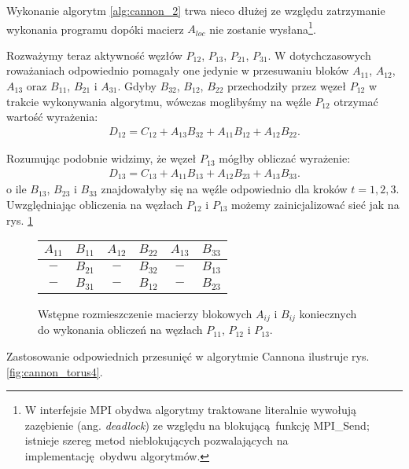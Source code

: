 Wykonanie algorytm \ref{alg:cannon_2} trwa nieco dłużej ze względu zatrzymanie wykonania programu dopóki macierz \(A_{loc}\) nie zostanie wysłana\footnote{W interfejsie MPI obydwa algorytmy traktowane literalnie wywołują zazębienie (ang. \emph{deadlock}) ze względu na blokującą funkcję MPI\_Send; istnieje szereg metod nieblokujących pozwalających na implementację obydwu algorytmów.}.

Rozważymy teraz aktywność węzłów \(P_{12}\), \(P_{13}\), \(P_{21}\), \(P_{31}\). W dotychczasowych roważaniach odpowiednio pomagały one jedynie w przesuwaniu bloków \(A_{11}\), \(A_{12}\), \(A_{13}\) oraz \(B_{11}\), \(B_{21}\) i \(A_{31}\). Gdyby \(B_{32}\), \(B_{12}\), \(B_{22}\) przechodziły przez węzeł \(P_{12}\) w trakcie wykonywania algorytmu, wówczas moglibyśmy na węźle \(P_{12}\) otrzymać wartość wyrażenia:
\begin{align*}
D_{12} = C_{12} + A_{13}B_{32} + A_{11}B_{12} + A_{12}B_{22}.
\end{align*}

\noindent Rozumując podobnie widzimy, że węzeł \(P_{13}\) mógłby obliczać wyrażenie:
\begin{align*}
D_{13} = C_{13} + A_{11}B_{13} + A_{12}B_{23} + A_{13}B_{33}.
\end{align*}
\noindent o ile \(B_{13}\), \(B_{23}\) i \(B_{33}\) znajdowałyby się na węźle odpowiednio dla kroków \(t=1, 2, 3\). Uwzględniając obliczenia na węzłach \(P_{12}\) i \(P_{13}\) możemy zainicjalizować sieć jak na rys. \ref{fig:cannon_torus_init}

\begin{figure}[h]
\centering
\begin{tabular}{|cc|cc|cc|}
\hline
\(A_{11}\) & \(B_{11}\) & \(A_{12}\) & \(B_{22}\) & \(A_{13}\) & \(B_{33}\) \\
\hline
\(-\) & \(B_{21}\) & \(-\) & \(B_{32}\) & \(-\) & \(B_{13}\) \\
\hline
\(-\) & \(B_{31}\) & \(-\) & \(B_{12}\) & \(-\) & \(B_{23}\) \\
\hline
\end{tabular}
\caption{Wstępne rozmieszczenie macierzy blokowych \(A_{ij}\) i \(B_{ij}\) koniecznych do wykonania obliczeń na węzłach \(P_{11}\), \(P_{12}\) i \(P_{13}\).}
\label{fig:cannon_torus_init}
\end{figure}

Zastosowanie odpowiednich przesunięć w algorytmie Cannona ilustruje rys. \ref{fig:cannon_torus4}.

